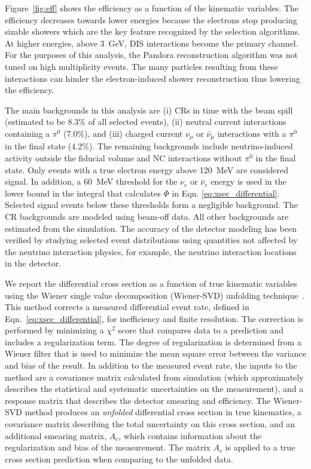 \documentclass[%
twocolumn,
superscriptaddress,
showpacs,preprintnumbers,
amsmath,amssymb,
aps,
prl,
longbibliography
]{revtex4-1}
\begin{document}
Figure~\ref{fig:eff} shows the efficiency as a function of the kinematic variables. The efficiency decreases towards lower energies because the electrons stop producing sizable showers which are the key feature recognized by the selection algorithms. At higher energies, above 3~GeV, DIS interactions become the primary channel. For the purposes of this analysis, the Pandora reconstruction algorithm was not tuned on high multiplicity events. The many particles resulting from these interactions can hinder the electron-induced shower reconstruction thus lowering the efficiency.


The main backgrounds in this analysis are (i) CRs in time with the beam spill (estimated to be 8.3\% of all selected events), (ii) neutral current interactions containing a $\pi^0$  (7.0\%), and (iii) charged current $\nu_{\mu}$ or $\bar{\nu}_{\mu}$ interactions with a $\pi^0$ in the final state (4.2\%). The remaining backgrounds include neutrino-induced activity outside the fiducial volume and NC interactions without $\pi^0$ in the final state. Only events with a true electron energy above 120~MeV are considered signal. In addition, a 60~MeV threshold for the $\nu_{e}$ or $\bar{\nu}_{e}$ energy is used in the lower bound in the integral that calculates $\Phi$ in Eqn. \ref{eq:xsec_differential}. Selected signal events below these thresholds form a negligible background. The CR backgrounds are modeled using beam-off data. All other backgrounds are estimated from the simulation. The accuracy of the detector modeling has been verified by studying selected event distributions using quantities not affected by the neutrino interaction physics, for example, the neutrino interaction locations in the detector.


We report the differential cross section as a function of true kinematic variables using the Wiener single value decomposition (Wiener-SVD) unfolding technique~\cite{Tang:2017rob}. This method corrects a measured  differential event rate, defined in Eqn.~\ref{eq:xsec_differential}, for inefficiency and finite resolution. The correction is performed by minimizing a $\chi^2$ score that compares data to a prediction and includes a regularization term. The degree of regularization is determined from a Wiener filter that is used to minimize the mean square error between the variance and bias of the result. In addition to the measured event rate, the 
inputs to the method are a covariance matrix calculated from 
simulation (which approximately describes the statistical and systematic uncertainties on the measurement), and a response matrix that describes the detector smearing and efficiency. 
The Wiener-SVD method produces an \textit{unfolded} differential cross section in true kinematics, a covariance matrix describing the total uncertainty on this cross section, and an additional smearing matrix, $A_{c}$, which contains information about the regularization and bias of the measurement. The matrix $A_{c}$ is applied to a true cross section prediction when comparing to the unfolded data.
\end{document}
